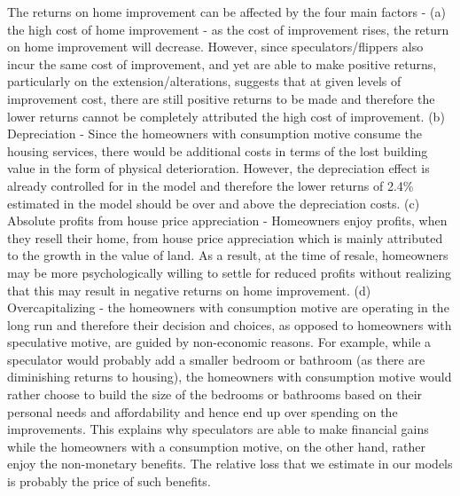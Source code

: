 \documentclass[AEJ,reqno, draftmode]{AEA} %
\begin{document}
The returns on home improvement can be affected by the four main factors - (a) the high cost of home improvement - as the cost of improvement rises, the return on home improvement will decrease. However, since speculators/flippers also incur the same cost of improvement, and yet are able to make positive returns, particularly on the extension/alterations, suggests that at given levels of improvement cost, there are still positive returns to be made and therefore the lower returns cannot be completely attributed the high cost of improvement. (b) Depreciation - Since the homeowners with consumption motive consume the housing services, there would be additional costs in terms of the lost building value in the form of physical deterioration. However, the depreciation effect is already controlled for in the model and therefore the lower returns of 2.4\% estimated in the model should be over and above the depreciation costs. (c) Absolute profits from house price appreciation - Homeowners enjoy profits, when they resell their home, from house price appreciation which is mainly attributed to the growth in the value of land. As a result, at the time of resale, homeowners may be more psychologically willing to settle for reduced profits without realizing that this may result in negative returns on home improvement. (d) Overcapitalizing - the homeowners with consumption motive are operating in the long run and therefore their decision and choices, as opposed to homeowners with speculative motive, are guided by non-economic reasons. For example, while a speculator would probably add a smaller bedroom or bathroom (as there are diminishing returns to housing), the homeowners with consumption motive would rather choose to build the size of the bedrooms or bathrooms based on their personal needs and affordability and hence end up over spending on the improvements. This explains why speculators are able to make financial gains while the homeowners with a consumption motive, on the other hand, rather enjoy the non-monetary benefits. The relative loss that we estimate in our models is probably the price of such benefits. %





\end{document}
